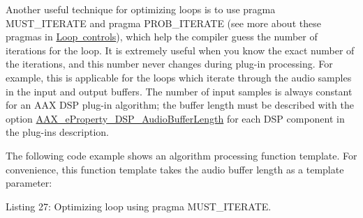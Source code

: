 Another useful technique for optimizing loops is to use {\ttfamily pragma M\+U\+S\+T\+\_\+\+I\+T\+E\+R\+A\+TE} and {\ttfamily pragma P\+R\+O\+B\+\_\+\+I\+T\+E\+R\+A\+TE} (see more about these pragmas in \mbox{\hyperlink{a00832_subsubsection__loop_controls_}{Loop controls}}), which help the compiler guess the number of iterations for the loop. It is extremely useful when you know the exact number of the iterations, and this number never changes during plug-\/in processing. For example, this is applicable for the loops which iterate through the audio samples in the input and output buffers. The number of input samples is always constant for an A\+AX D\+SP plug-\/in algorithm; the buffer length must be described with the option \mbox{\hyperlink{a00662_a13e384f22825afd3db6d68395b79ce0da09fbd1cbcae0e86ad81005258dc1b67e}{A\+A\+X\+\_\+e\+Property\+\_\+\+D\+S\+P\+\_\+\+Audio\+Buffer\+Length}} for each D\+SP component in the plug-\/in\textquotesingle{}s description.

The following code example shows an algorithm processing function template. For convenience, this function template takes the audio buffer length as a template parameter\+:


\begin{DoxyCode}{0}
\DoxyCodeLine{\{}
\DoxyCodeLine{   \{}
\DoxyCodeLine{}
\DoxyCodeLine{\textcolor{preprocessor}{      \#pragma MUST\_ITERATE( kAudioWindowSize, kAudioWindowSize, kAudioWindowSize )}}
\DoxyCodeLine{      \{}
\DoxyCodeLine{      \}}
\DoxyCodeLine{   \}}
\DoxyCodeLine{\} }
\end{DoxyCode}
  Listing 27\+: Optimizing loop using pragma M\+U\+S\+T\+\_\+\+I\+T\+E\+R\+A\+TE.

